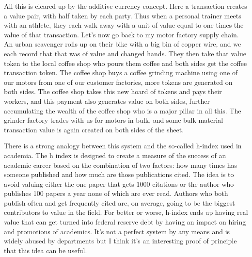 All this is cleared up by the additive currency concept. Here a
transaction creates a value pair, with half taken by each party. Thus
when a personal trainer meets with an athlete, they each walk away with
a unit of value equal to one times the value of that transaction. Let's
now go back to my motor factory supply chain. An urban scavenger rolls
up on their bike with a big bin of copper wire, and we each record that
that was of value and changed hands. They then take that value token to
the local coffee shop who pours them coffee and both sides get the
coffee transaction token. The coffee shop buys a coffee grinding machine
using one of our motors from one of our customer factories, more tokens
are generated on both sides. The coffee shop takes this new hoard of
tokens and pays their workers, and this payment also generates value on
both sides, further accumulating the wealth of the coffee shop who is a
major pillar in all this. The grinder factory trades with us for motors
in bulk, and some bulk material transaction value is again created on
both sides of the sheet.

There is a strong analogy between this system and the so-called h-index
used in academia. The h index is designed to create a measure of the
success of an academic career based on the combination of two factors:
how many times has someone published and how much are those publications
cited. The idea is to avoid valuing either the one paper that gets 1000
citations or the author who publishes 100 papers a year none of which
are ever read. Authors who both publish often and get frequently cited
are, on average, going to be the biggest contributors to value in the
field. For better or worse, h-index ends up having real value that can
get turned into federal reserve debt by having an impact on hiring and
promotions of academics. It's not a perfect system by any means and is
widely abused by departments but I think it's an interesting proof of
principle that this idea can be useful.

